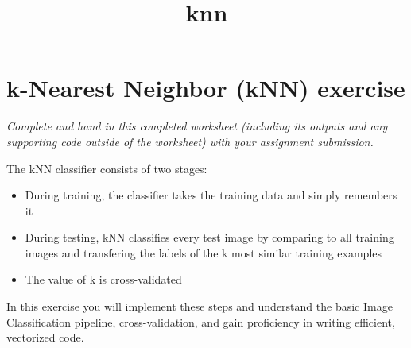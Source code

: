 \documentclass[11pt]{article}
\title{knn}
\providecommand{\tightlist}{%
      \setlength{\itemsep}{0pt}\setlength{\parskip}{0pt}}
\begin{document}
    
    
    \maketitle
    
    

    
    \hypertarget{k-nearest-neighbor-knn-exercise}{%
\section{k-Nearest Neighbor (kNN)
exercise}\label{k-nearest-neighbor-knn-exercise}}

\emph{Complete and hand in this completed worksheet (including its
outputs and any supporting code outside of the worksheet) with your
assignment submission.}

The kNN classifier consists of two stages:

\begin{itemize}
\tightlist
\item
  During training, the classifier takes the training data and simply
  remembers it
\item
  During testing, kNN classifies every test image by comparing to all
  training images and transfering the labels of the k most similar
  training examples
\item
  The value of k is cross-validated
\end{itemize}

In this exercise you will implement these steps and understand the basic
Image Classification pipeline, cross-validation, and gain proficiency in
writing efficient, vectorized code.
\end{document}
